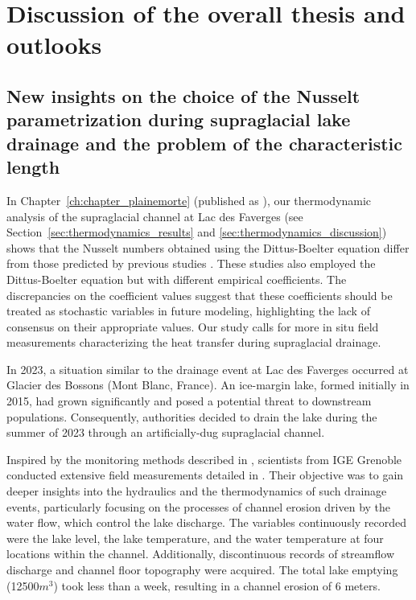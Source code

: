 \chapter{Discussion of the overall thesis and outlooks}
\label{ch:discussion}

\section{New insights on the choice of the Nusselt parametrization during supraglacial lake drainage and the problem of the characteristic length}

In Chapter~\ref{ch:chapter_plainemorte} (published as \cite{Ogier&al2021}), our thermodynamic analysis of the supraglacial channel at Lac des Faverges (see Section~\ref{sec:thermodynamics_results} and \ref{sec:thermodynamics_discussion}) shows that the Nusselt numbers obtained using the Dittus-Boelter equation differ from those predicted by previous studies \citep{Lunardini&al1986, Clarke2003, Vincent&al2010}. These studies also employed the Dittus-Boelter equation but with different empirical coefficients. The discrepancies on the coefficient values suggest that these coefficients should be treated as stochastic variables in future modeling, highlighting the lack of consensus on their appropriate values. Our study calls for more in situ field measurements characterizing the heat transfer during supraglacial drainage.

In 2023, a situation similar to the drainage event at Lac des Faverges occurred at Glacier des Bossons (Mont Blanc, France). An ice-margin lake, formed initially in 2015, had grown significantly and posed a potential threat to downstream populations. Consequently, authorities decided to drain the lake during the summer of 2023 through an artificially-dug supraglacial channel. 

Inspired by the monitoring methods described in \cite{Ogier&al2021}, scientists from IGE Grenoble conducted extensive field measurements detailed in \cite{Gagliardini&al2024}. Their objective was to gain deeper insights into the hydraulics and the thermodynamics of such drainage events, particularly focusing on the processes of channel erosion driven by the water flow, which control the lake discharge. The variables continuously recorded were the lake level, the lake temperature, and the water temperature at four locations within the channel. Additionally, discontinuous records of streamflow discharge and channel floor topography were acquired. The total lake emptying (12500$m^3$) took less than a week, resulting in a channel erosion of 6 meters.


